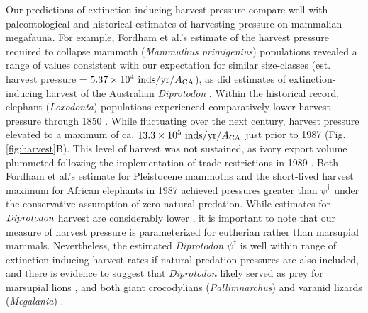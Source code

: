 \documentclass[]{rsos}%
\begin{document}
Our predictions of extinction-inducing harvest pressure compare well with paleontological and historical estimates of harvesting pressure on mammalian megafauna. 
For example, Fordham et al.'s \cite{fordham2022process} estimate of the harvest pressure required to collapse mammoth (\emph{Mammuthus primigenius}) populations \cite[using a formulation similar to that of Alroy;][]{alroy2001multispecies} revealed a range of values consistent with our expectation for similar size-classes (est. harvest pressure = $5.37\times10^4~{\rm inds/yr/}A_{\rm CA}$), as did estimates of extinction-inducing harvest of the Australian \emph{Diprotodon} \cite[est. harvest pressure = ca. 763 ${\rm inds/yr/}A_{\rm CA}$;][]{bradshaw2021relative}.
Within the historical record, elephant (\emph{Loxodonta}) populations experienced comparatively lower harvest pressure through 1850 \cite[ca. $466~{\rm inds/yr/}A_{\rm CA}$, derived from the volume of ivory exports;][]{milner1993exploitation}.
While fluctuating over the next century, harvest pressure elevated to a maximum of ca. $13.3\times 10^5~{\rm inds/yr/}A_{\rm CA}$ just prior to 1987 (Fig. \ref{fig:harvest}B).
This level of harvest was not sustained, as ivory export volume plummeted following the implementation of trade restrictions in 1989 \cite{milner1993exploitation}.
Both Fordham et al.'s \cite{fordham2022process} estimate for Pleistocene mammoths and the short-lived harvest maximum for African elephants in 1987 \cite{milner1993exploitation} achieved pressures greater than $\psi^\dagger$ under the conservative assumption of zero natural predation.
While estimates for $\emph{Diprotodon}$ harvest are considerably lower \cite{bradshaw2021relative}, it is important to note that our measure of harvest pressure is parameterized for eutherian rather than marsupial mammals.
Nevertheless, the estimated \emph{Diprotodon} $\psi^\dagger$ is well within range of extinction-inducing harvest rates if natural predation pressures are also included, and there is evidence to suggest that \emph{Diprotodon} likely served as prey for marsupial lions \cite{horton1981cuts,wroe1999estimating}, and both giant crocodylians (\emph{Pallimnarchus}) and varanid lizards (\emph{Megalania}) \cite{webb2009late}.
\end{document}
